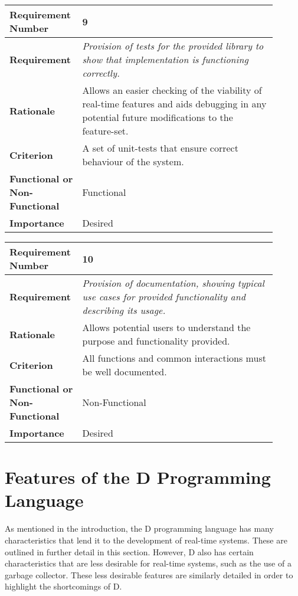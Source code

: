 \begin{table}[!h]
\centering
\begin{tabular}{|L{0.2\linewidth}|L{0.7\linewidth}|}
\hline
\textbf{Requirement Number}   & 9 \\ \hline
\textbf{Requirement} & \emph{Provision of tests for the provided library to show that 
                implementation is functioning correctly.} \\ \hline
\textbf{Rationale}      & Allows an easier checking of the viability of  
                real-time features and aids debugging in any potential future 
                modifications to the feature-set. \\ \hline
\textbf{Criterion}      & A set of unit-tests that ensure correct behaviour of the system. \\ \hline
\textbf{Functional or Non-Functional} & Functional \\ \hline
\textbf{Importance}     & Desired \\ \hline
\end{tabular}
\end{table}
\begin{table}[!h]
\centering
\begin{tabular}{|L{0.2\linewidth}|L{0.7\linewidth}|}
\hline
\textbf{Requirement Number} & 10 \\ \hline
\textbf{Requirement} & \emph{Provision of documentation, showing typical use cases for provided 
                functionality and describing its usage.} \\ \hline
\textbf{Rationale}      & Allows potential users to understand the purpose and 
                functionality provided. \\ \hline
\textbf{Criterion}      & All functions and common interactions must be well documented. \\ \hline
\textbf{Functional or Non-Functional} & Non-Functional \\ \hline
\textbf{Importance}     & Desired \\ \hline
\end{tabular}
\end{table}
\FloatBarrier
\section{Features of the D Programming Language}
As mentioned in the introduction, the D programming language has many 
characteristics that lend it to the development of real-time systems.
These are outlined in further detail in this section. 
However, D also has certain characteristics that are less desirable for 
real-time systems, such as the use of a garbage collector. 
These less desirable features are similarly detailed in order to highlight the 
shortcomings of D. 

